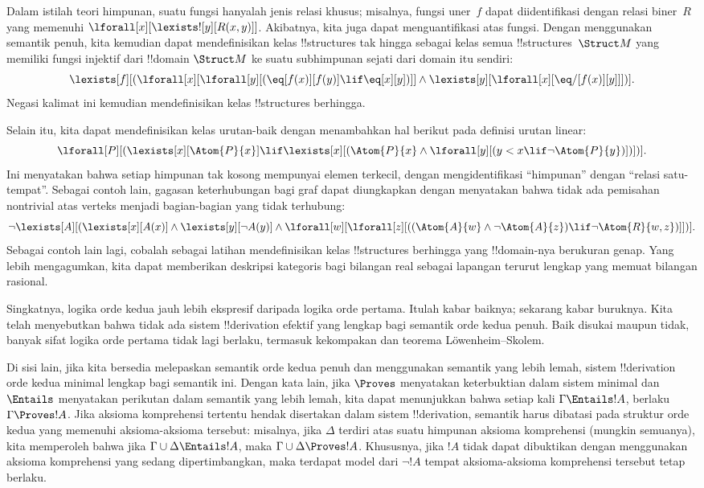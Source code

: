 \documentclass[../../../include/open-logic-section]{subfiles}
\begin{document}
Dalam istilah teori himpunan, suatu fungsi hanyalah jenis relasi khusus;
misalnya, fungsi uner~$f$ dapat diidentifikasi dengan relasi biner~$R$ yang
memenuhi $\lforall[x][\lexists![y][R(x,y)]]$. Akibatnya, kita juga dapat
menguantifikasi atas fungsi. Dengan menggunakan semantik penuh, kita kemudian
dapat mendefinisikan kelas !!{structure}s tak hingga sebagai kelas semua
!!{structure}s~$\Struct M$ yang memiliki fungsi injektif dari !!{domain}
$\Struct M$ ke suatu subhimpunan sejati dari domain itu sendiri:
\[
\lexists[f][(\lforall[x][\lforall[y][(\eq[f(x)][f(y)] \lif \eq[x][y])]]
  \land \lexists[y][\lforall[x][\eq/[f(x)][y]]])].
\]
Negasi kalimat ini kemudian mendefinisikan kelas !!{structure}s berhingga.

Selain itu, kita dapat mendefinisikan kelas urutan-baik dengan menambahkan
hal berikut pada definisi urutan linear:
\[
\lforall[P][(\lexists[x][\Atom{P}{x}] \lif \lexists[x][(\Atom{P}{x}
    \land \lforall[y][(y < x \lif \lnot \Atom{P}{y})])])].
\]
Ini menyatakan bahwa setiap himpunan tak kosong mempunyai elemen terkecil,
dengan mengidentifikasi ``himpunan'' dengan ``relasi satu-tempat''. Sebagai
contoh lain, gagasan keterhubungan bagi graf dapat diungkapkan dengan
menyatakan bahwa tidak ada pemisahan nontrivial atas verteks menjadi
bagian-bagian yang tidak terhubung:
\[
\lnot \lexists[A][(\lexists[x][A(x)] \land \lexists[y][\lnot A(y)]
  \land \lforall[w][\lforall[z][((\Atom{A}{w} \land \lnot \Atom{A}{z})
      \lif \lnot \Atom{R}{w,z})]])].
\]
Sebagai contoh lain lagi, cobalah sebagai latihan mendefinisikan kelas
!!{structure}s berhingga yang !!{domain}-nya berukuran genap. Yang lebih
mengagumkan, kita dapat memberikan deskripsi kategoris bagi bilangan real
sebagai lapangan terurut lengkap yang memuat bilangan rasional.

Singkatnya, logika orde kedua jauh lebih ekspresif daripada logika orde
pertama. Itulah kabar baiknya; sekarang kabar buruknya. Kita telah menyebutkan
bahwa tidak ada sistem !!{derivation} efektif yang lengkap bagi semantik orde
kedua penuh. Baik disukai maupun tidak, banyak sifat logika orde pertama tidak
lagi berlaku, termasuk kekompakan dan teorema L\"owenheim--Skolem.

Di sisi lain, jika kita bersedia melepaskan semantik orde kedua penuh dan
menggunakan semantik yang lebih lemah, sistem !!{derivation} orde kedua
minimal lengkap bagi semantik ini. Dengan kata lain, jika $\Proves$ menyatakan
keterbuktian dalam sistem minimal dan $\Entails$ menyatakan perikutan dalam
semantik yang lebih lemah, kita dapat menunjukkan bahwa setiap kali $\Gamma
\Entails !A$, berlaku $\Gamma \Proves !A$. Jika aksioma komprehensi tertentu
hendak disertakan dalam sistem
!!{derivation}, semantik harus dibatasi pada struktur orde kedua yang memenuhi
aksioma-aksioma tersebut: misalnya, jika $\Delta$ terdiri atas suatu himpunan
aksioma komprehensi (mungkin semuanya), kita memperoleh bahwa jika $\Gamma
\cup \Delta \Entails !A$, maka $\Gamma \cup \Delta \Proves !A$. Khususnya,
jika $!A$ tidak dapat dibuktikan dengan menggunakan aksioma komprehensi yang
sedang dipertimbangkan, maka terdapat model dari $\lnot !A$ tempat
aksioma-aksioma komprehensi tersebut tetap berlaku.
\end{document}
